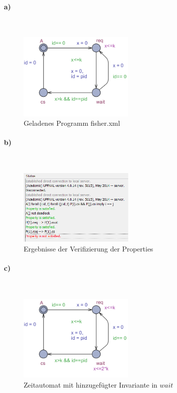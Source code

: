 
\paragraph{a)}\mbox{} \\

\begin{figure}[H] 
	\centering 
	\includegraphics[width=0.5\textwidth]{./UPAAAL_Screens/Aufgabe1a}
	\caption[Aufgabe 1a)]{Geladenes Programm fisher.xml}    
\end{figure}


\paragraph{b)}\mbox{} \\

\begin{figure}[H] 
	\centering 
	\includegraphics[width=0.5\textwidth]{./UPAAAL_Screens/Aufgabe1b}
	\caption[Aufgabe 1b)]{Ergebnisse der Verifizierung der Properties}    
\end{figure}

\newpage

\paragraph{c)}\mbox{} \\

\begin{figure}[H] 
	\centering 
	\includegraphics[width=0.5\textwidth]{./UPAAAL_Screens/Aufgabe1c_Invariante}
	\caption[Aufgabe 1c)]{Zeitautomat mit hinzugefügter Invariante in $wait$}    
\end{figure}

